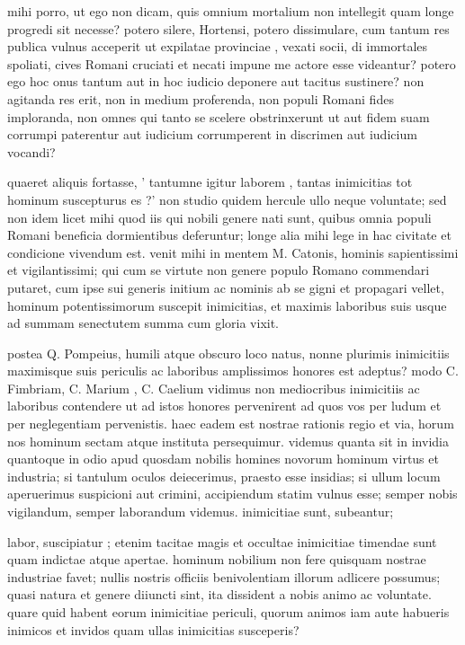  mihi porro, ut ego non dicam, quis omnium mortalium non intellegit quam longe progredi sit necesse? potero silere, Hortensi, potero dissimulare, cum tantum res publica vulnus acceperit ut expilatae provinciae , vexati socii, di immortales spoliati, cives Romani cruciati et necati impune me actore esse videantur? potero ego hoc onus tantum aut in hoc iudicio deponere aut tacitus sustinere? non agitanda res erit, non in medium proferenda, non populi Romani fides imploranda, non omnes qui tanto se scelere obstrinxerunt ut aut fidem suam corrumpi paterentur aut iudicium corrumperent in discrimen aut iudicium vocandi?

 quaeret aliquis fortasse, ' tantumne igitur laborem , tantas inimicitias tot hominum suscepturus es ?' non studio quidem hercule ullo neque voluntate; sed non idem licet mihi quod iis qui nobili genere nati sunt, quibus omnia populi Romani beneficia dormientibus deferuntur; longe alia mihi lege in hac civitate et condicione vivendum est. venit mihi in mentem M. Catonis, hominis sapientissimi et vigilantissimi; qui cum se virtute non genere populo Romano commendari putaret, cum ipse sui generis initium ac nominis ab se gigni et propagari vellet, hominum potentissimorum suscepit inimicitias, et maximis laboribus suis usque ad summam senectutem summa cum gloria vixit.

 postea Q. Pompeius, humili atque obscuro loco natus, nonne plurimis inimicitiis maximisque suis periculis ac laboribus amplissimos honores est adeptus? modo C. Fimbriam, C. Marium , C. Caelium vidimus non mediocribus inimicitiis ac laboribus contendere ut ad istos honores pervenirent ad quos vos per ludum et per neglegentiam pervenistis. haec eadem est nostrae rationis regio et via, horum nos hominum sectam atque instituta persequimur. videmus quanta sit in invidia quantoque in odio apud quosdam nobilis homines novorum hominum virtus et industria; si tantulum oculos deiecerimus, praesto esse insidias; si ullum locum aperuerimus suspicioni aut crimini, accipiendum statim vulnus esse; semper nobis vigilandum, semper laborandum videmus. inimicitiae sunt, subeantur;

 labor, suscipiatur ; etenim tacitae magis et occultae inimicitiae timendae sunt quam indictae atque apertae. hominum nobilium non fere quisquam nostrae industriae favet; nullis nostris officiis benivolentiam illorum adlicere possumus; quasi natura et genere diiuncti sint, ita dissident a nobis animo ac voluntate. quare quid habent eorum inimicitiae periculi, quorum animos iam aute habueris inimicos et invidos quam ullas inimicitias susceperis?

